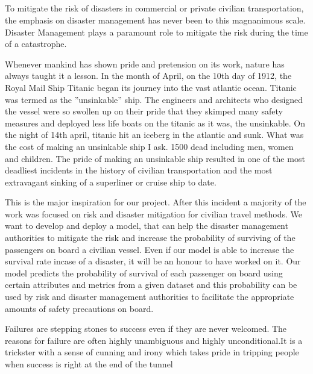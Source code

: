 \documentclass[12pt]{article}
\newcommand{\nd}{\noindent}
\newcommand{\subsize}{\fontsize{14pt}{12pt}\selectfont}
\begin{document}
\newpage

\subsection{\textbf{\subsize{MOTIVATION}}}
\nd To mitigate the risk of disasters in commercial or private civilian transportation, the emphasis on disaster management has never been to this magnanimous scale. Disaster Management plays a paramount role to mitigate the risk during the time of a catastrophe. 

\nd Whenever mankind has shown pride and pretension on its work, nature has always taught it a lesson. In the month of April, on the 10th day of 1912,  the Royal Mail Ship Titanic began its journey into the vast atlantic ocean. Titanic was termed as the ”unsinkable” ship. The engineers and architects who designed the vessel were so swollen up on their pride that they skimped many safety measures and deployed less life boats on the titanic as it was, the unsinkable. On the night of 14th april, titanic hit an iceberg in the atlantic and sunk. What was the cost of making an unsinkable ship I ask. 1500 dead including men, women and children. The pride of making an unsinkable ship resulted in one of the most deadliest incidents in the history of civilian transportation and the most extravagant sinking of a superliner or cruise ship to date.

\nd This is the major inspiration for our project. After this incident a majority of the work was focused on risk and disaster mitigation for civilian travel methods. We want to develop and deploy a model, that can help the disaster management authorities to mitigate the risk and increase the probability of surviving of the passengers on board a civilian vessel. Even if our model is able to increase the survival rate incase of a disaster, it will be an honour to have worked on it. Our model predicts the probability of survival of each passenger on board using certain attributes and metrics from a given dataset and this probability can be used by risk and disaster management authorities to facilitate the appropriate amounts of safety precautions on board.

\nd Failures are stepping stones to success even if they are never welcomed. The reasons for failure are often highly unambiguous and highly unconditional.It is a trickster with a sense of cunning and irony which takes pride in tripping people when success is right at the end of the tunnel 

\newpage
\end{document}
